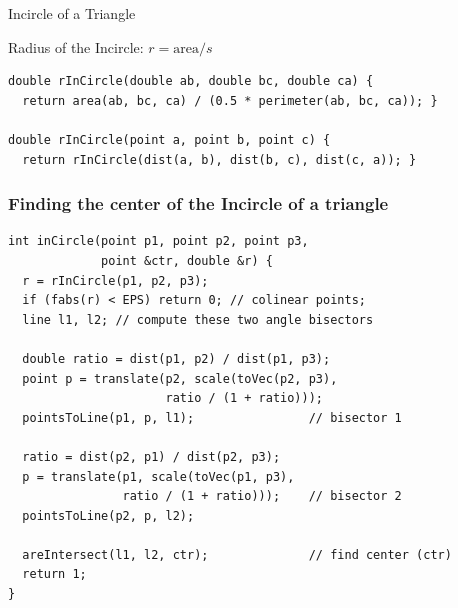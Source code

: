 \begin{frame}[fragile]{Incircle of a Triangle}
    \begin{exampleblock}{Radius of the Incircle: $r = \text{area}/s$}
      {\smaller
\begin{verbatim}
double rInCircle(double ab, double bc, double ca) {
  return area(ab, bc, ca) / (0.5 * perimeter(ab, bc, ca)); }

double rInCircle(point a, point b, point c) {
  return rInCircle(dist(a, b), dist(b, c), dist(c, a)); }
\end{verbatim}}

    \end{exampleblock}
\end{frame}

\begin{frame}[fragile]
  \frametitle{Finding the center of the Incircle of a triangle}
  {\smaller
    \begin{exampleblock}{}
\begin{verbatim}
int inCircle(point p1, point p2, point p3,
             point &ctr, double &r) {
  r = rInCircle(p1, p2, p3);
  if (fabs(r) < EPS) return 0; // colinear points;
  line l1, l2; // compute these two angle bisectors

  double ratio = dist(p1, p2) / dist(p1, p3);
  point p = translate(p2, scale(toVec(p2, p3),
                      ratio / (1 + ratio)));
  pointsToLine(p1, p, l1);                // bisector 1

  ratio = dist(p2, p1) / dist(p2, p3);
  p = translate(p1, scale(toVec(p1, p3),
                ratio / (1 + ratio)));    // bisector 2
  pointsToLine(p2, p, l2);

  areIntersect(l1, l2, ctr);              // find center (ctr)
  return 1;
}
\end{verbatim}
    \end{exampleblock}
    }
\end{frame}

